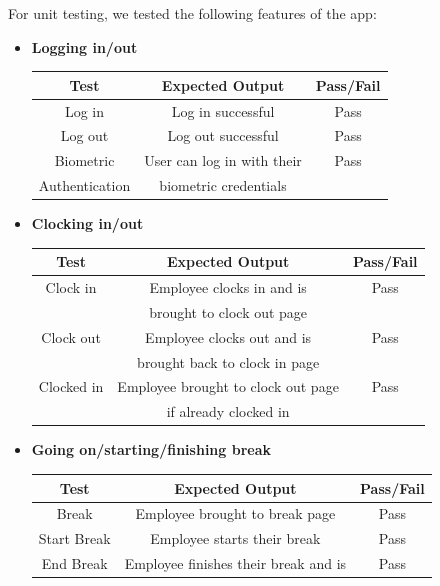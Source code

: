 For unit testing, we tested the following features of the app:
\begin{itemize}
    \item \textbf{Logging in/out}  
    \begin{center}
     \begin{tabular}{||c c c||} 
      \hline
      Test & Expected Output & Pass/Fail \\ [0.5ex] 
      \hline\hline
      Log in & Log in successful & Pass \\
      \hline
      Log out & Log out successful & Pass \\
      \hline
      Biometric & User can log in with their  & Pass \\
      Authentication & biometric credentials &  \\
      \hline
     \end{tabular}
    \end{center}
    \item \textbf{Clocking in/out}
    \begin{center}
     \begin{tabular}{||c c c||} 
      \hline
      Test & Expected Output & Pass/Fail \\ [0.5ex] 
      \hline\hline
       Clock in & Employee clocks in and is & Pass \\
        & brought to clock out page &   \\
      \hline
      Clock out & Employee clocks out and is & Pass \\
        & brought back to clock in page &   \\
      \hline
      Clocked in & Employee brought to clock out page & Pass \\
        & if already clocked in &   \\
      \hline
     \end{tabular}
    \end{center}
    \item \textbf{Going on/starting/finishing break}
    \begin{center}
     \begin{tabular}{||c c c||} 
      \hline
      Test & Expected Output & Pass/Fail \\ [0.5ex] 
      \hline\hline
      Break & Employee brought to break page & Pass \\
      \hline
      Start Break & Employee starts their break & Pass \\
      \hline
      End Break & Employee finishes their break and is & Pass \\

\end{tabular}
\end{center}
\end{itemize}
